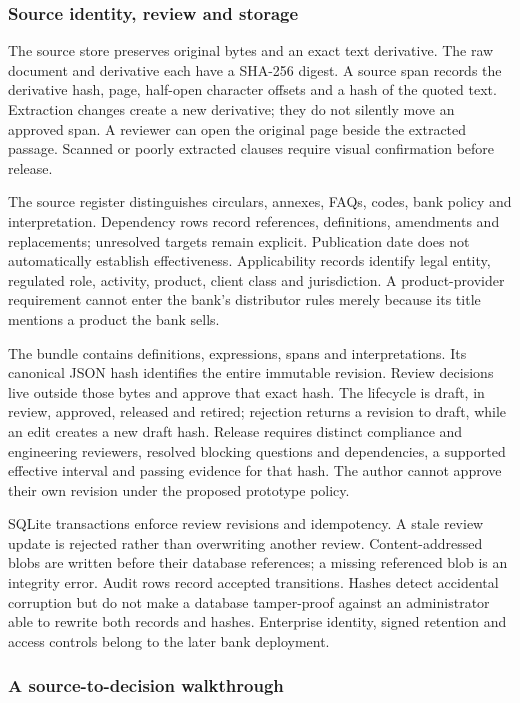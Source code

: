 \subsubsection{Source identity, review and storage}

The source store preserves original bytes and an exact text derivative. The raw
document and derivative each have a SHA-256 digest. A source span records the
derivative hash, page, half-open character offsets and a hash of the quoted text.
Extraction changes create a new derivative; they do not silently move an approved
span. A reviewer can open the original page beside the extracted passage.
Scanned or poorly extracted clauses require visual confirmation before release.

The source register distinguishes circulars, annexes, FAQs, codes, bank policy
and interpretation. Dependency rows record references, definitions, amendments
and replacements; unresolved targets remain explicit. Publication date does not
automatically establish effectiveness. Applicability records identify legal
entity, regulated role, activity, product, client class and jurisdiction. A
product-provider requirement cannot enter the bank's distributor rules merely
because its title mentions a product the bank sells.

The bundle contains definitions, expressions, spans and interpretations. Its
canonical JSON hash identifies the entire immutable revision. Review decisions
live outside those bytes and approve that exact hash. The lifecycle is draft,
in review, approved, released and retired; rejection returns a revision to draft,
while an edit creates a new draft hash. Release requires distinct compliance and
engineering reviewers, resolved blocking questions and dependencies, a supported
effective interval and passing evidence for that hash. The author cannot approve
their own revision under the proposed prototype policy.

SQLite transactions enforce review revisions and idempotency. A stale review
update is rejected rather than overwriting another review. Content-addressed
blobs are written before their database references; a missing referenced blob
is an integrity error. Audit rows record accepted transitions. Hashes detect
accidental corruption but do not make a database tamper-proof against an
administrator able to rewrite both records and hashes. Enterprise identity,
signed retention and access controls belong to the later bank deployment.

\subsubsection{A source-to-decision walkthrough}

